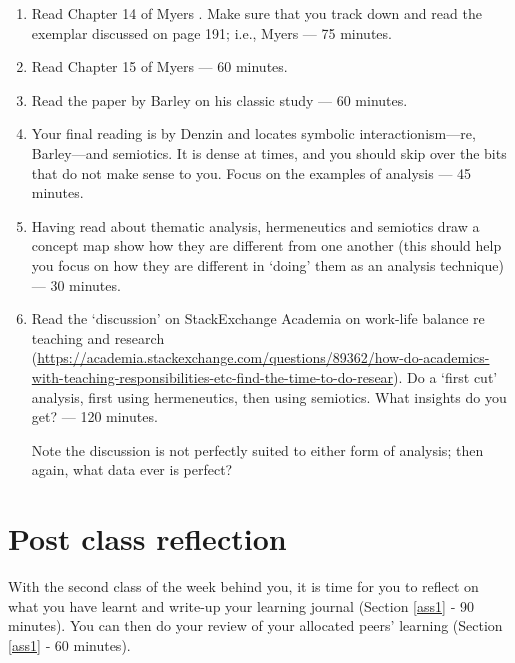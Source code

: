 \documentclass[]{book}
\theoremstyle{definition}
\theoremstyle{definition}
\theoremstyle{definition}
\theoremstyle{remark}
\begin{document}
\begin{enumerate}
\def\labelenumi{\arabic{enumi}.}
\item
  Read Chapter 14 of Myers \autocite*[
  p.~183--196]{myers_2013_qualitativeresearchbusiness}. Make sure that
  you track down and read the exemplar discussed on page 191; i.e.,
  Myers \autocite*{myers_1994_disastereveryonesee} --- 75 minutes.
\item
  Read Chapter 15 of Myers \autocite*[
  p.~197--208]{myers_2013_qualitativeresearchbusiness} --- 60 minutes.
\item
  Read the paper by Barley \autocite*{barley_1990_imagesimagingnotes} on
  his classic study \autocite*[ which you do not need to
  read]{barley_1986_technologyoccasionstructuring} --- 60 minutes.
\item
  Your final reading is by Denzin
  \autocite*{denzin_1987_semioticssymbolicinteractionism} and locates
  symbolic interactionism---re, Barley---and semiotics. It is dense at
  times, and you should skip over the bits that do not make sense to
  you. Focus on the examples of analysis --- 45 minutes.
\item
  Having read about thematic analysis, hermeneutics and semiotics draw a
  concept map show how they are different from one another (this should
  help you focus on how they are different in `doing' them as an
  analysis technique) --- 30 minutes.
\item
  Read the `discussion' on StackExchange Academia on work-life balance
  re teaching and research
  (\url{https://academia.stackexchange.com/questions/89362/how-do-academics-with-teaching-responsibilities-etc-find-the-time-to-do-resear}).
  Do a `first cut' analysis, first using hermeneutics, then using
  semiotics. What insights do you get? --- 120 minutes.

  Note the discussion is not perfectly suited to either form of
  analysis; then again, what data ever is perfect?
\end{enumerate}

\hypertarget{post-class-reflection-7}{%
\section*{Post class reflection}\label{post-class-reflection-7}}

With the second class of the week behind you, it is time for you to
reflect on what you have learnt and write-up your learning journal
(Section \ref{ass1} ‐ 90 minutes). You can then do your review of your
allocated peers' learning (Section \ref{ass1} ‐ 60 minutes).
\end{document}
